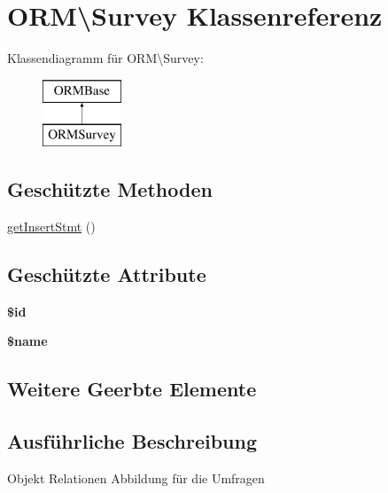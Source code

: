 \hypertarget{class_o_r_m_1_1_survey}{\section{O\-R\-M\textbackslash{}Survey Klassenreferenz}
\label{class_o_r_m_1_1_survey}
}
Klassendiagramm für O\-R\-M\textbackslash{}Survey\-:\begin{figure}[H]
\begin{center}
\leavevmode
\includegraphics[height=2.000000cm]{class_o_r_m_1_1_survey}
\end{center}
\end{figure}
\subsection*{Geschützte Methoden}
\begin{DoxyCompactItemize}
\item 
\hyperlink{class_o_r_m_1_1_survey_a4c6f22552b020a5e4c16267b6a03b0d2}{get\-Insert\-Stmt} ()
\end{DoxyCompactItemize}
\subsection*{Geschützte Attribute}
\begin{DoxyCompactItemize}
\item 
\hypertarget{class_o_r_m_1_1_survey_ae66423a875a7da609262e9bdec4e89aa}{{\bfseries \$id}}\label{class_o_r_m_1_1_survey_ae66423a875a7da609262e9bdec4e89aa}

\item 
\hypertarget{class_o_r_m_1_1_survey_a934a3ecd51cc0752953ec921797ef470}{{\bfseries \$name}}\label{class_o_r_m_1_1_survey_a934a3ecd51cc0752953ec921797ef470}

\end{DoxyCompactItemize}
\subsection*{Weitere Geerbte Elemente}


\subsection{Ausführliche Beschreibung}
Objekt Relationen Abbildung für die Umfragen 

